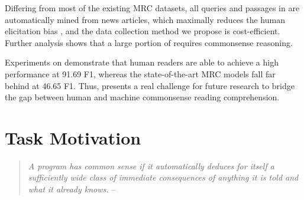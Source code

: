 Differing from most of the existing MRC datasets, all queries and passages in \ReCoRD are automatically mined from news articles, which maximally reduces the human elicitation bias \cite{reporting-bias,vision-reporting-bias,joci},
and the data collection method we propose is cost-efficient.
Further analysis shows that
a large portion of \ReCoRD requires commonsense reasoning.

Experiments on \ReCoRD demonstrate that human readers are able to achieve a high performance at 91.69 F1, whereas the state-of-the-art MRC models fall far behind at 46.65 F1.
Thus, \ReCoRD presents a real challenge for future research to bridge the gap between human and machine commonsense reading comprehension.

\section{Task Motivation}
\label{sec:task}

\begin{quote}
  {\emph{A program has common sense if it automatically deduces for itself a sufficiently wide class of immediate consequences of anything it is told and what it already knows.} --~}
\end{quote}

